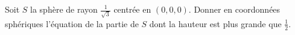 
\begin{exercice}\label{exoOutilsMath-0026}

	Soit $S$ la sphère de rayon $\frac{1}{ \sqrt{3} }$ centrée en $(0,0,0)$. Donner en coordonnées sphériques l'équation de la partie de $S$ dont la hauteur est plus grande que $\frac{ 1 }{2}$.

\end{exercice}
